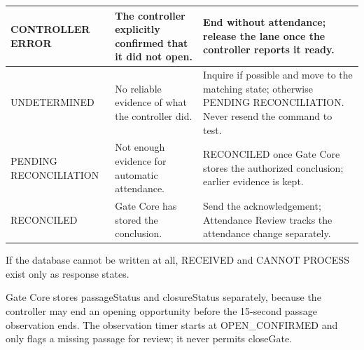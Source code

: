 \begin{longtable}{|>{\raggedright\arraybackslash}p{106.5pt}|>{\raggedright\arraybackslash}p{109.5pt}|>{\raggedright\arraybackslash}p{173.5pt}|}
\hline
CONTROLLER ERROR & The controller explicitly confirmed that it did not open. & End without attendance; release the lane once the controller reports it ready. \\
\hline
UNDETERMINED & No reliable evidence of what the controller did. & Inquire if possible and move to the matching state; otherwise PENDING RECONCILIATION. Never resend the command to test. \\
\hline
PENDING RECONCILIATION & Not enough evidence for automatic attendance. & RECONCILED once Gate Core stores the authorized conclusion; earlier evidence is kept. \\*
\hline\noalign{\nobreak}
RECONCILED & Gate Core has stored the conclusion. & Send the acknowledgement; Attendance Review tracks the attendance change separately. \\
\hline
\end{longtable}


If the database cannot be written at all, RECEIVED and CANNOT PROCESS exist only as response states.

Gate Core stores passageStatus and closureStatus separately, because the controller may end an opening opportunity before the 15-second passage observation ends. The observation timer starts at OPEN\_CONFIRMED and only flags a missing passage for review; it never permits closeGate.

